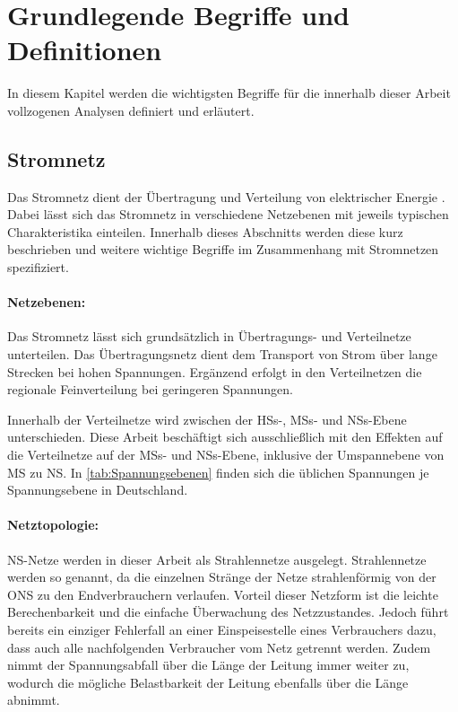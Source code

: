 \section{Grundlegende Begriffe und Definitionen}\label{chap:base_theo}

In diesem Kapitel werden die wichtigsten Begriffe für die innerhalb dieser Arbeit vollzogenen Analysen definiert und erläutert.


\subsection{Stromnetz}\label{chap:theo_grid}

Das Stromnetz dient der Übertragung und Verteilung von elektrischer Energie \cite{Paschotta2020}.
Dabei lässt sich das Stromnetz in verschiedene Netzebenen mit jeweils typischen Charakteristika einteilen.
Innerhalb dieses Abschnitts werden diese kurz beschrieben und weitere wichtige Begriffe im Zusammenhang mit Stromnetzen spezifiziert.


\paragraph{Netzebenen:}

Das Stromnetz lässt sich grundsätzlich in Übertragungs- und Verteilnetze unterteilen.
Das Übertragungsnetz dient dem Transport von Strom über lange Strecken bei hohen Spannungen.
Ergänzend erfolgt in den Verteilnetzen die regionale Feinverteilung bei geringeren Spannungen. \cite{Agora2019}\medskip

Innerhalb der Verteilnetze wird zwischen der \glspl{HS}-, \glspl{MS}- und \glspl{NS}-Ebene unterschieden.
Diese Arbeit beschäftigt sich ausschließlich mit den Effekten auf die Verteilnetze auf der \glspl{MS}- und \glspl{NS}-Ebene, inklusive der Umspannebene von \gls{MS} zu \gls{NS}.
In \autoref{tab:Spannungsebenen} finden sich die üblichen Spannungen je Spannungsebene in Deutschland.




\paragraph{Netztopologie:}

\gls{NS}-Netze werden in dieser Arbeit als Strahlennetze ausgelegt.
Strahlennetze werden so genannt, da die einzelnen Stränge der Netze strahlenförmig von der \gls{ONS} zu den Endverbrauchern verlaufen.
Vorteil dieser Netzform ist die leichte Berechenbarkeit und die einfache Überwachung des Netzzustandes.
Jedoch führt bereits ein einziger Fehlerfall an einer Einspeisestelle eines Verbrauchers dazu, dass auch alle nachfolgenden Verbraucher vom Netz getrennt werden.
Zudem nimmt der Spannungsabfall über die Länge der Leitung immer weiter zu, wodurch die mögliche Belastbarkeit der Leitung ebenfalls über die Länge abnimmt.

